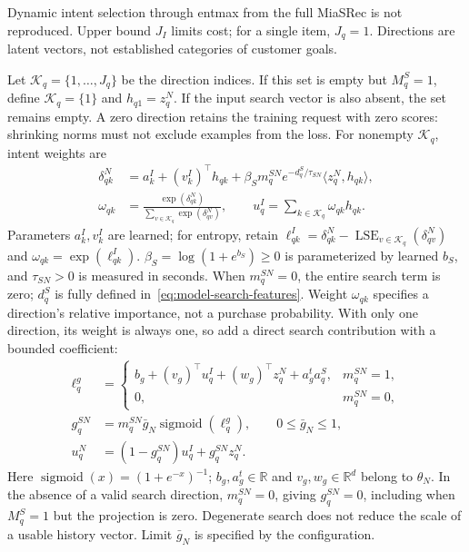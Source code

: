 \documentclass[12pt,a4paper]{article}
\newcommand{\R}{\mathbb R}
\DeclareMathOperator{\sigmoid}{sigmoid}
\theoremstyle{plainru}
\begin{document}
Dynamic intent selection through entmax from the full MiaSRec
is not reproduced. Upper bound $J_I$ limits cost;
for a single item, $J_q=1$. Directions are latent vectors,
not established categories of customer goals.

Let $\mathcal K_q=\{1,\ldots,J_q\}$ be the direction indices.
If this set is empty but $M_q^S=1$, define
$\mathcal K_q=\{1\}$ and $h_{q1}=z_q^N$.
If the input search vector is also absent, the set remains empty.
A zero direction retains the training request with zero scores:
shrinking norms must not exclude examples from the loss.
For nonempty $\mathcal K_q$, intent weights are
\begin{align}\label{eq:modern-intent-weights}
\delta_{qk}^{N}&=a_k^I+(v_k^I)^\top h_{qk}
+\beta_Sm_q^{SN}e^{-d_q^S/\tau_{SN}}
\langle z_q^N,h_{qk}\rangle,\\
\omega_{qk}&=\frac{\exp(\delta_{qk}^{N})}
{\sum_{v\in\mathcal K_q}\exp(\delta_{qv}^{N})},\qquad
u_q^I=\sum_{k\in\mathcal K_q}\omega_{qk}h_{qk}.
\nonumber
\end{align}
Parameters $a_k^I,v_k^I$ are learned;
for entropy, retain $\ell_{qk}^{I}=\delta_{qk}^N-
\operatorname{LSE}_{v\in\mathcal K_q}(\delta_{qv}^N)$ and
$\omega_{qk}=\exp(\ell_{qk}^{I})$.
$\beta_S=\log(1+e^{b_S})\ge0$ is parameterized by learned $b_S$,
and $\tau_{SN}>0$ is measured in seconds.
When $m_q^{SN}=0$, the entire search term is zero;
$d_q^S$ is fully defined in~\eqref{eq:model-search-features}.
Weight $\omega_{qk}$ specifies a direction's relative importance,
not a purchase probability. With only one direction, its weight is always
one, so add a direct search contribution with a bounded coefficient:
\begin{align}\label{eq:modern-search-gate}
\ell_q^g&=\begin{cases}
b_g+(v_g)^\top u_q^I+(w_g)^\top z_q^N+a_g^t a_q^S,
&m_q^{SN}=1,\\
0,&m_q^{SN}=0,
\end{cases}\\
g_q^{SN}&=m_q^{SN}\bar g_N\sigmoid(\ell_q^g),
\qquad 0\le\bar g_N\le1,\nonumber\\
u_q^N&=(1-g_q^{SN})u_q^I+g_q^{SN}z_q^N.
\nonumber
\end{align}
Here $\sigmoid(x)=(1+e^{-x})^{-1}$;
$b_g,a_g^t\in\R$ and $v_g,w_g\in\R^d$ belong to $\theta_N$.
In the absence of a valid search direction, $m_q^{SN}=0$,
giving $g_q^{SN}=0$, including when $M_q^S=1$ but the projection is zero.
Degenerate search does not reduce the scale of a usable history vector.
Limit $\bar g_N$ is specified by the configuration.
\end{document}
